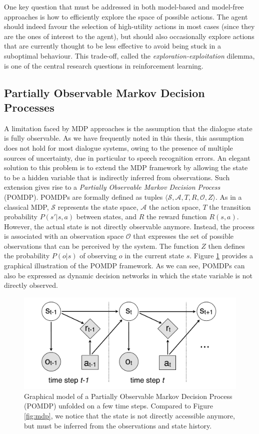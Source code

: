 One key question that must be addressed in both model-based and model-free approaches is how  to efficiently explore the space of possible actions.  The agent should indeed favour the selection of high-utility actions in most cases (since they are the ones of interest to the agent), but should also occasionally explore actions that are currently thought to be less effective to avoid being stuck in a suboptimal behaviour. This trade-off, called the \textit{exploration-exploitation} dilemma, is one of the central research questions in reinforcement learning. 


\subsection{Partially Observable Markov Decision Processes}
\label{sec:pomdp}

A limitation faced by MDP approaches is the assumption that the dialogue state is fully observable. As we have frequently noted in this thesis, this assumption does not hold for most dialogue systems, owing to the presence of multiple sources of uncertainty, due in particular to speech recognition errors.  An elegant solution to this problem is to extend the MDP framework by allowing the state to be a hidden variable that is indirectly inferred from observations.  Such extension gives rise to a  \textit{Partially Observable Markov Decision Process} (POMDP).  POMDPs are formally defined as tuples $\langle \mathcal{S}, \mathcal{A}, T, R, \mathcal{O}, Z \rangle$.  As in a classical MDP, $\mathcal{S}$ represents the state space, $\mathcal{A}$ the action space, $T$ the transition probability $P(s'|s,a)$ between states, and $R$ the reward function $R(s,a)$.  However, the actual state is not directly observable anymore.  Instead, the process is associated with an observation space $\mathcal{O}$ that expresses the set of possible observations that can be perceived by the system. The function $Z$ then defines the probability $P(o|s)$ of observing $o$ in the current state $s$.  Figure \ref{fig:pomdp} provides a graphical illustration of the POMDP framework.  As we can see, POMDPs can also be expressed as dynamic decision networks in which the state variable is not directly observed. 

\begin{figure}[h]
\centering
\includegraphics[scale=0.25]{imgs/POMDP.pdf}
\caption{Graphical model of a Partially Observable Markov Decision Process (POMDP) unfolded on a few time steps.  Compared to Figure \ref{fig:mdp}, we notice that the state is not directly accessible anymore, but must be inferred from the observations and state history. }
\label{fig:pomdp}
\end{figure}

